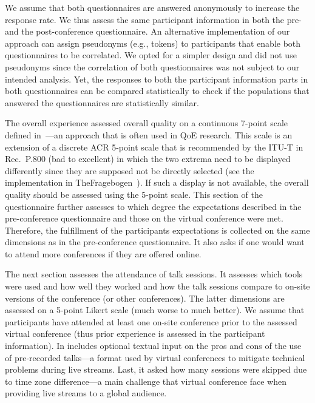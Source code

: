 \documentclass[sigconf]{acmart}
\begin{document}
We assume that both questionnaires are answered anonymously to increase the response rate.
We thus assess the same participant information in both the pre- and the post-conference questionnaire.
An alternative implementation of our approach can assign pseudonyms (e.g., tokens) to participants that enable both questionnaires to be correlated.
We opted for a simpler design and did not use pseudonyms since the correlation of both questionnaires was not subject to our intended analysis.
Yet, the responses to both the participant information parts in both questionnaires can be compared statistically to check if the populations that answered the questionnaires are statistically similar.

The overall experience assessed overall quality on a continuous 7-point scale defined in~\cite{itu-t_recommendation_p.851_subjective_2003}---an approach that is often used in \ac{QoE} research.
This scale is an extension of a discrete ACR 5-point scale that is recommended by the ITU-T in Rec.\ P.800 (bad to excellent) in which the two extrema need to be displayed differently since they are supposed not be directly selected (see the implementation in TheFragebogen~\cite{TheFragebogen}).
If such a display is not available, the overall quality should be assessed using the 5-point scale.
This section of the questionnaire further assesses to which degree the expectations described in the pre-conference questionnaire and those on the virtual conference were met.
Therefore, the fulfillment of the participants expectations is collected on the same dimensions as in the pre-conference questionnaire.
It also asks if one would want to attend more conferences if they are offered online.

The next section assesses the attendance of talk sessions.
It assesses which tools were used and how well they worked and how the talk sessions compare to on-site versions of the conference (or other conferences).
The latter dimensions are assessed on a 5-point Likert scale (much worse to much better).
We assume that participants have attended at least one on-site conference prior to the assessed virtual conference (thus prior experience is assessed in the participant information). 
In includes optional textual input on the pros and cons of the use of pre-recorded talks---a format used by virtual conferences to mitigate technical problems during live streams.
Last, it asked how many sessions were skipped due to time zone difference---a main challenge that virtual conference face when providing live streams to a global audience.
\end{document}
